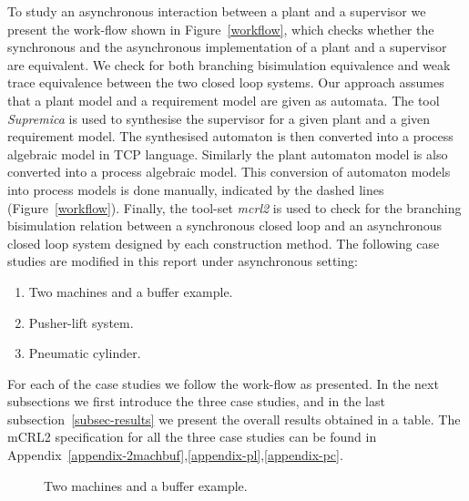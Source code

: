 \documentclass[a4paper,english,final]{article}
\theoremstyle{plain}
\theoremstyle{definition}
\begin{document}
To study an asynchronous interaction between a plant and a supervisor we present the work-flow shown in Figure~\ref{workflow}, which checks whether the synchronous and the asynchronous implementation of a plant and a supervisor are equivalent. We check for both branching bisimulation equivalence and weak trace equivalence between the two closed loop systems. Our approach assumes that a plant model and a requirement model are given as automata. The tool \textit{Supremica} \citep{supremica} is used to synthesise the supervisor for a given plant and a given requirement model. The synthesised automaton is then converted into a process algebraic model in TCP language. Similarly the plant automaton model is also converted into a process algebraic model. This conversion of automaton models into process models is done manually, indicated by the dashed lines (Figure~\ref{workflow}). Finally, the tool-set \textit{mcrl2} \citep{mcrl2} is used to check for the branching bisimulation relation between a synchronous closed loop and an asynchronous closed loop system designed by each construction method. The following case studies are modified in this report under asynchronous setting:
\begin{enumerate}
\item Two machines and a buffer example.
\item Pusher-lift system.
\item Pneumatic cylinder.
\end{enumerate}
For each of the case studies we follow the work-flow as presented. In the next subsections we first introduce the three case studies, and in the last subsection~\ref{subsec-results} we present the overall results obtained in a table. The mCRL2 specification for all the three case studies can be found in Appendix~\ref{appendix-2machbuf},\ref{appendix-pl},\ref{appendix-pc}.


\begin{figure}\centering
{}
\hspace{1cm}  
\vspace{1cm} 
\caption{Two machines and a buffer example.}\label{2machbuf}
\end{figure}
\end{document}
